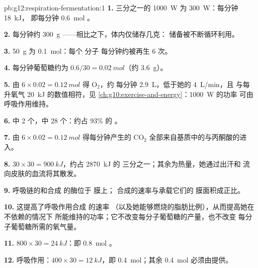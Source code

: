 \begin{solution}{pb:g12:respiration-fermentation:1}
\textbf{1.} 三分之一的 \qty{1000}{W} 为 \qty{300}{W}：每分钟 \qty{18}{kJ}，
即每分钟 \qty{0.6}{mol} 。

\textbf{2.} 每分钟约 \qty{300}{g} ——相比之下，体内仅储存几克：
储备被不断循环利用。

\textbf{3.} \qty{50}{g} 为 \qty{0.1}{mol}：每个  分子
每分钟约被再生 6 次。

\textbf{4.} 每分钟葡萄糖约为 $0.6/30 = \qty{0.02}{mol}$（约
\qty{3.6}{g}）。

\textbf{5.} 由 $6 \times 0.02 = \qty{0.12}{mol}$ 得 $\mathrm{O_2}$，约
每分钟 \qty{2.9}{L}，低于她的 \qty{4}{L/min}，且
与每升氧气 \qty{20}{kJ} 的数值相符，见
\cref{ch:g10:exercise-and-energy}：\qty{1000}{W} 的功率
可由呼吸作用维持。

\textbf{6.} 中 2 个，中 28 个：约占
93\% 的 。

\textbf{7.} 由 $6 \times 0.02 = \qty{0.12}{mol}$ 得每分钟产生的 $\mathrm{CO_2}$
全部来自基质中的与丙酮酸的进入。

\textbf{8.} $30 \times 30 = \qty{900}{kJ}$，约占 \qty{2870}{kJ} 的
三分之一；其余为热量，她通过出汗和
流向皮肤的血流将其散发。

\textbf{9.} 呼吸链的和合成  的酶位于
膜上； 合成的速率与承载它们的
膜面积成正比。

\textbf{10.} 这提高了呼吸作用合成  的速率
（以及她能够燃烧的脂肪比例），从而提高她在不依赖的情况下
所能维持的功率；它不改变每分子葡萄糖的产量，也不改变
每分子葡萄糖所需的氧气量。

\textbf{11.} $800 \times 30 = \qty{24}{kJ}$：即 \qty{0.8}{mol} 。

\textbf{12.} 呼吸作用：$400 \times 30 = \qty{12}{kJ}$，即
\qty{0.4}{mol}；其余 \qty{0.4}{mol} 必须由提供。


\end{solution}
